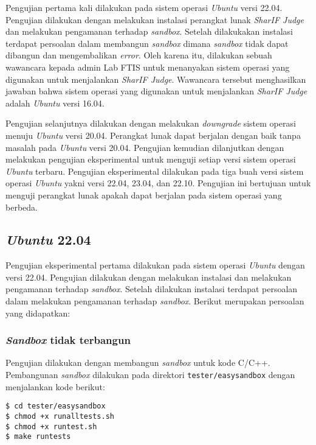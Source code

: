Pengujian pertama kali dilakukan pada sistem operasi \textit{Ubuntu} versi 22.04. Pengujian dilakukan dengan melakukan instalasi perangkat lunak \textit{SharIF Judge} dan melakukan pengamanan terhadap \textit{sandbox}. Setelah dilakukakan instalasi terdapat persoalan dalam membangun \textit{sandbox} dimana \textit{sandbox} tidak dapat dibangun dan mengembalikan \textit{error}. Oleh karena itu, dilakukan sebuah wawancara kepada admin Lab FTIS untuk menanyakan sistem operasi yang digunakan untuk menjalankan \textit{SharIF Judge}. Wawancara tersebut menghasilkan jawaban bahwa sistem operasi yang digunakan untuk menjalankan \textit{SharIF Judge} adalah \textit{Ubuntu} versi 16.04.

Pengujian selanjutnya dilakukan dengan melakukan \textit{downgrade} sistem operasi menuju \textit{Ubuntu} versi 20.04. Perangkat lunak dapat berjalan dengan baik tanpa masalah pada \textit{Ubuntu} versi 20.04. Pengujian kemudian dilanjutkan dengan melakukan pengujian eksperimental untuk menguji setiap versi sistem operasi \textit{Ubuntu} terbaru. Pengujian eksperimental dilakukan pada tiga buah versi sistem operasi \textit{Ubuntu} yakni versi 22.04, 23.04, dan 22.10. Pengujian ini bertujuan untuk menguji perangkat lunak apakah dapat berjalan pada sistem operasi yang berbeda.

\subsection{\textit{Ubuntu} 22.04}
Pengujian eksperimental pertama dilakukan pada sistem operasi \textit{Ubuntu} dengan versi 22.04. Pengujian dilakukan dengan melakukan instalasi dan melakukan pengamanan terhadap \textit{sandbox}. Setelah dilakukan instalasi terdapat persoalan dalam melakukan pengamanan terhadap \textit{sandbox}. Berikut merupakan persoalan yang didapatkan:
\subsubsection{\textit{Sandbox} tidak terbangun}
Pengujian dilakukan dengan membangun \textit{sandbox} untuk kode C/C++. Pembangunan \textit{sandbox} dilakukan pada direktori \texttt{tester/easysandbox} dengan menjalankan kode berikut:
\begin{lstlisting}[caption=Pembangunan \textit{sandbox} pada \textit{Ubuntu} 22.04, label=kode:sandbox2204]
$ cd tester/easysandbox
$ chmod +x runalltests.sh
$ chmod +x runtest.sh
$ make runtests
\end{lstlisting}

